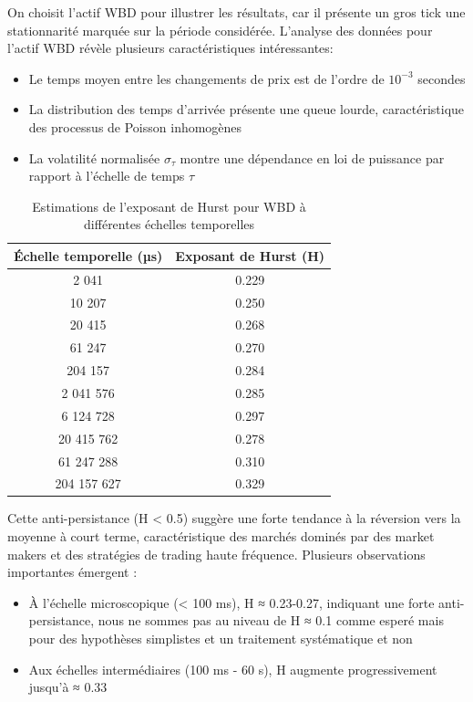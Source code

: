 \documentclass[10pt,a4paper]{article}
\theoremstyle{definition}
\theoremstyle{remark}
\begin{document}
\begin{itemize}
On choisit l'actif WBD pour illustrer les résultats, car il présente un gros tick une stationnarité marquée sur la période considérée.
L'analyse des données pour l'actif WBD révèle plusieurs caractéristiques intéressantes:

\begin{itemize}
    \item Le temps moyen entre les changements de prix est de l'ordre de \(10^{-3}\) secondes
    \item La distribution des temps d'arrivée présente une queue lourde, caractéristique des processus de Poisson inhomogènes
    \item La volatilité normalisée \(\sigma_{\tau}\) montre une dépendance en loi de puissance par rapport à l'échelle de temps \(\tau\)
\end{itemize}
\begin{table}[h!]
\centering
\begin{tabular}{|c|c|}
\hline
\textbf{Échelle temporelle (µs)} & \textbf{Exposant de Hurst (H)} \\
\hline
2 041 & 0.229 \\
10 207 & 0.250 \\
20 415 & 0.268 \\
61 247 & 0.270 \\
204 157 & 0.284 \\
2 041 576 & 0.285 \\
6 124 728 & 0.297 \\
20 415 762 & 0.278 \\
61 247 288 & 0.310 \\
204 157 627 & 0.329 \\
\hline
\end{tabular}
\caption{Estimations de l'exposant de Hurst pour WBD à différentes échelles temporelles}
\label{tab:hurst_exponents}
\end{table}

Cette anti-persistance (H < 0.5) suggère une forte tendance à la réversion vers la moyenne à court terme, caractéristique des marchés dominés par des market makers et des stratégies de trading haute fréquence. Plusieurs observations importantes émergent :

\begin{itemize}
    \item À l'échelle microscopique (< 100 ms), H ≈ 0.23-0.27, indiquant une forte anti-persistance, nous ne sommes pas au niveau de H ≈ 0.1 comme esperé mais pour des hypothèses simplistes et un traitement systématique et non 
    \item Aux échelles intermédiaires (100 ms - 60 s), H augmente progressivement jusqu'à ≈ 0.33
\end{itemize}


\end{itemize}
\end{document}
